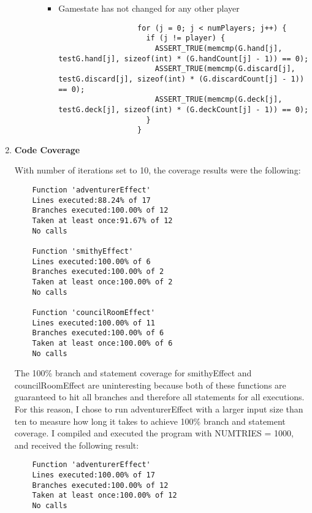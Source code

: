 \documentclass[11pt,letterpaper]{article}
\begin{document}
\begin{enumerate}[label=\arabic*., leftmargin=*]
\begin{itemize}[leftmargin=*]
\begin{itemize}[leftmargin=*]
\begin{itemize}[leftmargin=*]
              \item Gamestate has not changed for any other player
                  \begin{lstlisting}
                  for (j = 0; j < numPlayers; j++) {
                    if (j != player) {
                      ASSERT_TRUE(memcmp(G.hand[j], testG.hand[j], sizeof(int) * (G.handCount[j] - 1)) == 0);
                      ASSERT_TRUE(memcmp(G.discard[j], testG.discard[j], sizeof(int) * (G.discardCount[j] - 1)) == 0);
                      ASSERT_TRUE(memcmp(G.deck[j], testG.deck[j], sizeof(int) * (G.deckCount[j] - 1)) == 0);
                    }
                  }
                  \end{lstlisting}
          \end{itemize}
      \end{itemize}
    \end{itemize}

  \item \textbf{Code Coverage}
  
    With number of iterations set to 10, the coverage results were the following: 
    \begin{lstlisting}
    Function 'adventurerEffect'
    Lines executed:88.24% of 17
    Branches executed:100.00% of 12
    Taken at least once:91.67% of 12
    No calls

    Function 'smithyEffect'
    Lines executed:100.00% of 6
    Branches executed:100.00% of 2
    Taken at least once:100.00% of 2
    No calls

    Function 'councilRoomEffect'
    Lines executed:100.00% of 11
    Branches executed:100.00% of 6
    Taken at least once:100.00% of 6
    No calls
    \end{lstlisting}
  
    The 100\% branch and statement coverage for smithyEffect and councilRoomEffect are uninteresting
    because both of these functions are guaranteed to hit all branches and therefore all 
    statements for all executions. For this reason, I chose to run adventurerEffect
    with a larger input size than ten to measure how long it takes to achieve 100\% 
    branch and statement coverage. I compiled and executed the program with NUMTRIES = 1000, 
    and received the following result: 

    \begin{lstlisting}
    Function 'adventurerEffect'
    Lines executed:100.00% of 17
    Branches executed:100.00% of 12
    Taken at least once:100.00% of 12
    No calls
    \end{lstlisting}


\end{enumerate}
\end{document}
